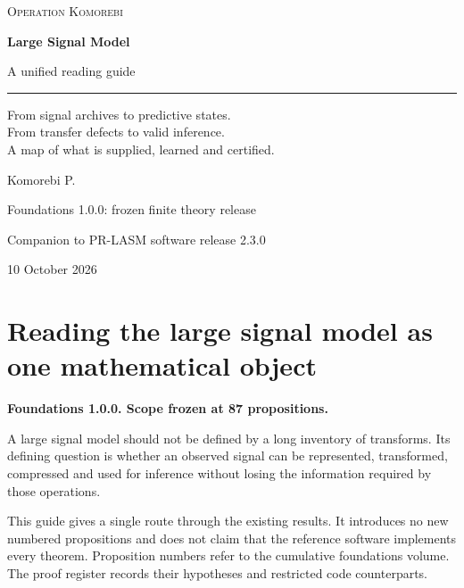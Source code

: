 \documentclass[11pt,letterpaper]{article}
\begin{document}
\hypersetup{pageanchor=false}
\begin{titlepage}
\vspace*{0.5in}
{\small\textsc{Operation Komorebi}\par}
\vspace{0.72in}
{\fontsize{33}{39}\selectfont\bfseries Large Signal Model\par}
\vspace{0.3in}
{\fontsize{21}{27}\selectfont A unified reading guide\par}
\vspace{0.45in}
\rule{\textwidth}{0.45pt}\par
\vspace{0.3in}
\begin{minipage}{0.95\textwidth}
\large
From signal archives to predictive states.\\From transfer defects to valid inference.\\A map of what is supplied, learned and certified.
\end{minipage}
\vfill
{\Large Komorebi P.\par}
\vspace{0.2in}
{\normalsize Foundations 1.0.0: frozen finite theory release\par}
{\normalsize Companion to PR-LASM software release 2.3.0\par}
{\normalsize 10 October 2026\par}
\end{titlepage}
\hypersetup{pageanchor=true}
\begingroup\footnotesize\setlength{\cftbeforesecskip}{0pt}\tableofcontents\endgroup\newpage

\section{Reading the large signal model as one mathematical
object}\label{reading-the-large-signal-model-as-one-mathematical-object}

\textbf{Foundations 1.0.0. Scope frozen at 87 propositions.}

A large signal model should not be defined by a long inventory of
transforms. Its defining question is whether an observed signal can be
represented, transformed, compressed and used for inference without
losing the information required by those operations.

This guide gives a single route through the existing results. It
introduces no new numbered propositions and does not claim that the
reference software implements every theorem. Proposition numbers refer
to the cumulative foundations volume. The proof register records their
hypotheses and restricted code counterparts.
\end{document}
